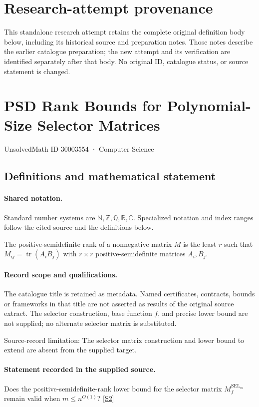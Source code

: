 \documentclass[11pt]{article}
\begin{document}
\section*{Research-attempt provenance}
This standalone research attempt retains the complete original definition body below,
including its historical source and preparation notes. Those notes describe the
earlier catalogue preparation; the new attempt and its verification are identified
separately after that body. No original ID, catalogue status, or source statement is changed.

\section{PSD Rank Bounds for Polynomial-Size Selector Matrices}\label{30003554}
{\small UnsolvedMath ID 30003554 · Computer Science}
\subsection{Definitions and mathematical statement}

\paragraph{Shared notation.}Standard number systems are $\mathbb N,\mathbb Z,\mathbb Q,\mathbb R,\mathbb C$. Specialized notation and index ranges follow the cited source and the definitions below.


The positive-semidefinite rank of a nonnegative matrix $M$ is the least $r$ such that $M_{ij}=\operatorname{tr}(A_iB_j)$ with $r\times r$ positive-semidefinite matrices $A_i,B_j$.
\paragraph{Record scope and qualifications.}
The catalogue title is retained as metadata. Named certificates, contracts, bounds or frameworks in that title are not asserted as results of the original source extract.
The selector construction, base function $f$, and precise lower bound are not supplied; no alternate selector matrix is substituted.

Source-record limitation: The selector matrix construction and lower bound to extend are absent from the supplied target.
\paragraph{Statement recorded in the supplied source.}
Does the positive-semidefinite-rank lower bound for the selector matrix $M_f^{\operatorname{SEL}_m}$ remain valid when $m\leq n^{O(1)}$? \href{https://doi.org/10.4171/owr/2017/37}{[S2]}
\end{document}
